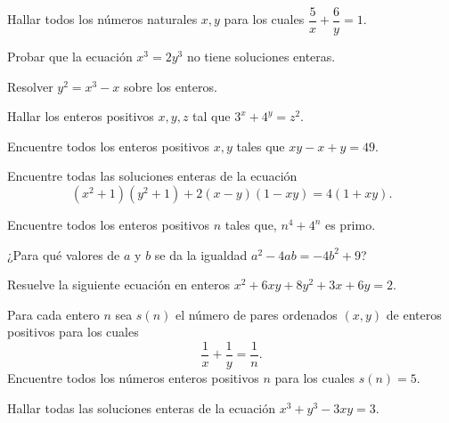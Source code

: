 \begin{exercise}
    Hallar todos los números naturales $x,y$ para los cuales $\dfrac{5}{x} + \dfrac{6}{y} = 1$.
\end{exercise}

\begin{exercise}
    Probar que la ecuación $x^3 = 2y^3$ no tiene soluciones enteras.
\end{exercise}

\begin{exercise}
    Resolver $y^2 = x^3 - x$ sobre los enteros.
\end{exercise}

\begin{exercise}
    Hallar los enteros positivos $x,y,z$ tal que $3^x + 4^y = z^2$.
\end{exercise}

\begin{exercise}
    Encuentre todos los enteros positivos $x, y$ tales que $xy - x + y = 49$.
\end{exercise}

\begin{exercise}
    Encuentre todas las soluciones enteras de la ecuación
    \[
        (x^2 + 1)(y^2 + 1) + 2(x - y)(1 - xy) = 4(1 + xy).
    \]
\end{exercise}

\begin{exercise}
    Encuentre todos los enteros positivos $n$ tales que, $n^4 + 4^n$ es primo.
\end{exercise}

\begin{exercise}
    ¿Para qué valores de $a$ y $b$ se da la igualdad $a^2 - 4ab = - 4b^2 + 9$?
\end{exercise}

\begin{exercise}
    Resuelve la siguiente ecuación en enteros $x^2 + 6xy + 8y^2 + 3x + 6y = 2$.
\end{exercise}

\begin{exercise}
    Para cada entero $n$ sea $s(n)$ el número de pares ordenados $(x, y)$ de enteros positivos para los cuales
    \[
        \frac{1}{x} + \frac{1}{y} = \frac{1}{n}.
    \]
    Encuentre todos los números enteros positivos $n$ para los cuales $s(n) = 5$.
\end{exercise}

\begin{exercise}
    Hallar todas las soluciones enteras de la ecuación $x^3 + y^3 - 3xy = 3$.
\end{exercise}

